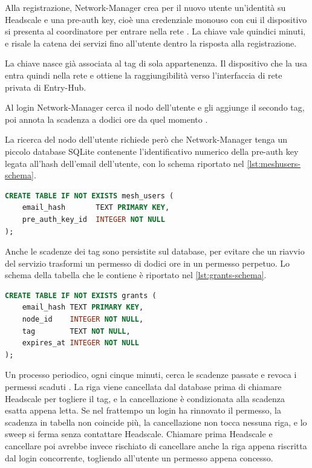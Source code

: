 Alla registrazione, Network-Manager crea per il nuovo utente un'identità su Headscale e una pre-auth key,
cioè una credenziale monouso con cui il dispositivo si presenta al coordinatore per entrare nella rete
\cite{ramusb-code-mesh-user}. La chiave vale quindici minuti, e risale la catena dei servizi fino
all'utente dentro la risposta alla registrazione.

La chiave nasce già associata al tag di sola appartenenza. Il dispositivo che la usa entra quindi nella
rete e ottiene la raggiungibilità verso l'interfaccia di rete privata di Entry-Hub.

Al login Network-Manager cerca il nodo dell'utente e gli aggiunge il secondo tag, poi annota la scadenza a 
dodici ore da quel momento \cite{ramusb-code-grant}.

La ricerca del nodo dell'utente richiede però che Network-Manager tenga un piccolo database SQLite
contenente l'identificativo numerico della pre-auth key legata all'hash dell'email dell'utente, con lo
schema riportato nel \autoref{lst:meshusers-schema}.

\begin{lstlisting}[language=sql, caption={Schema della tabella di corrispondenza email-pre-auth-key, da
\texttt{meshusers.go} \cite{ramusb-code-meshusers-schema}.}, label={lst:meshusers-schema}]
CREATE TABLE IF NOT EXISTS mesh_users (
	email_hash       TEXT PRIMARY KEY,
	pre_auth_key_id  INTEGER NOT NULL
);
\end{lstlisting}

Anche le scadenze dei tag sono persistite sul database, per evitare che un riavvio del servizio trasformi 
un permesso di dodici ore in un permesso perpetuo. Lo schema della tabella che le contiene è riportato nel
\autoref{lst:grants-schema}.

\begin{lstlisting}[language=sql, caption={Schema della tabella dei permessi di accesso, da \texttt{store.go}
\cite{ramusb-code-grants-schema}.}, label={lst:grants-schema}]
CREATE TABLE IF NOT EXISTS grants (
	email_hash TEXT PRIMARY KEY,
	node_id    INTEGER NOT NULL,
	tag        TEXT NOT NULL,
	expires_at INTEGER NOT NULL
);
\end{lstlisting}

Un processo periodico, ogni cinque minuti, cerca le scadenze passate e revoca i permessi scaduti
\cite{ramusb-code-sweep}. La riga viene cancellata dal database prima di chiamare Headscale per togliere 
il tag, e la cancellazione è condizionata alla scadenza esatta appena letta.
Se nel frattempo un login ha rinnovato il permesso, la scadenza in tabella non coincide più, la cancellazione
non tocca nessuna riga, e lo sweep si ferma senza contattare Headscale. 
Chiamare prima Headscale e cancellare poi avrebbe invece rischiato di cancellare anche la riga
appena riscritta dal login concorrente, togliendo all'utente un permesso appena concesso.

